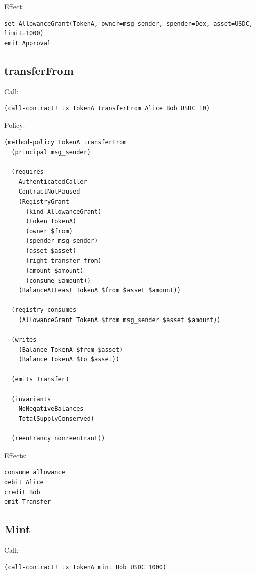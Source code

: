 Effect:

\begin{lstlisting}
set AllowanceGrant(TokenA, owner=msg_sender, spender=Dex, asset=USDC, limit=1000)
emit Approval
\end{lstlisting}

\subsection{transferFrom}

Call:

\begin{lstlisting}
(call-contract! tx TokenA transferFrom Alice Bob USDC 10)
\end{lstlisting}

Policy:

\begin{lstlisting}
(method-policy TokenA transferFrom
  (principal msg_sender)

  (requires
    AuthenticatedCaller
    ContractNotPaused
    (RegistryGrant
      (kind AllowanceGrant)
      (token TokenA)
      (owner $from)
      (spender msg_sender)
      (asset $asset)
      (right transfer-from)
      (amount $amount)
      (consume $amount))
    (BalanceAtLeast TokenA $from $asset $amount))

  (registry-consumes
    (AllowanceGrant TokenA $from msg_sender $asset $amount))

  (writes
    (Balance TokenA $from $asset)
    (Balance TokenA $to $asset))

  (emits Transfer)

  (invariants
    NoNegativeBalances
    TotalSupplyConserved)

  (reentrancy nonreentrant))
\end{lstlisting}

Effects:

\begin{lstlisting}
consume allowance
debit Alice
credit Bob
emit Transfer
\end{lstlisting}

\subsection{Mint}

Call:

\begin{lstlisting}
(call-contract! tx TokenA mint Bob USDC 1000)
\end{lstlisting}

